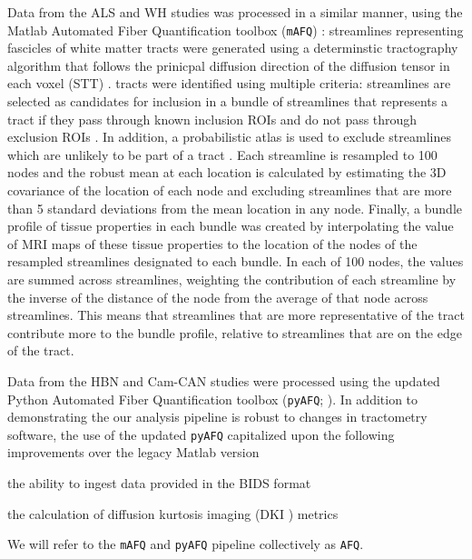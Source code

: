 \documentclass[10pt,letterpaper]{article}
\begin{document}
Data from the ALS and WH studies was processed in a similar manner,
using the Matlab Automated Fiber Quantification toolbox
(\texttt{mAFQ})
\cite{yeatman2012tract}: streamlines representing fascicles of white
matter tracts were generated using a determinstic tractography algorithm
that follows the prinicpal diffusion direction of the diffusion tensor
in each voxel (STT) \cite{basser2000vivo}. 
tracts were identified
using multiple criteria: streamlines are selected as candidates for
inclusion in a bundle of streamlines that represents a tract if they
pass through known inclusion ROIs and do not pass through exclusion
ROIs \cite{wakana2007reproducibility}. In addition, a probabilistic
atlas is used to exclude streamlines which are unlikely to be part of
a tract \cite{Hua2008-sh}. Each streamline is resampled to 100 nodes
and the robust mean at each location is calculated by estimating the 3D
covariance of the location of each node and excluding streamlines that
are more than 5 standard deviations from the mean location in any node.
Finally, a bundle profile of tissue properties in each bundle was created
by interpolating the value of MRI maps of these tissue properties to the
location of the nodes of the resampled streamlines designated to each
bundle. In each of 100 nodes, the values are summed across streamlines,
weighting the contribution of each streamline by the inverse of the
 distance of the node from the average of
that node across streamlines. This means that streamlines that are more
representative of the tract contribute more to the bundle profile, relative
to streamlines that are on the edge of the tract.

Data from the HBN and Cam-CAN studies were processed using the updated Python
Automated Fiber Quantification toolbox (\texttt{pyAFQ}; \cite{kruper2021evaluating}). In
addition to demonstrating the our analysis pipeline is robust to changes in
tractometry software, the use of the updated \texttt{pyAFQ} capitalized upon
the following improvements over the legacy Matlab version
\begin{enumerate*}[%
    label=(\roman*),%
    before=\unskip{: },%
    itemjoin={{, }},%
    itemjoin*={{, and }}]
    \item the ability to ingest data provided in the BIDS format
    \cite{gorgolewski2016brain}
    \item the calculation of diffusion kurtosis imaging (DKI
    \cite{jensen2005diffusion}) metrics
\end{enumerate*}
We will refer to the \texttt{mAFQ} and \texttt{pyAFQ} pipeline collectively
as \texttt{AFQ}.
\end{document}
